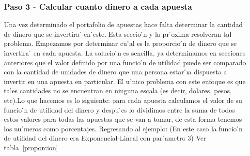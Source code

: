 \begin{table}[ht]
\centering
{}
\caption{Escogiendo apuestas que vale la pena realizar}
\label{seleccion}
\end{table}

\subsubsection{Paso 3 - Calcular cuanto dinero a cada apuesta}

Una vez determinado el portafolio de apuestas hace falta determinar la cantidad de dinero que se invertira ́ en  ́este. Esta seccio ́n y la pr ́oxima resolveran tal problema.
 Empezamos por determinar cu ́al es la proporcio ́n de dinero que se invertira ́ en cada apuesta. La solucio ́n es sencilla, ya determinamos en secciones anteriores que el valor definido por una funcio ́n de utilidad puede ser comparado con la cantidad de unidades de dinero que una persona estar ́ıa dispuesta a invertir en una apuesta en particular. El u ́nico problema con este enfoque es que tales cantidades no se encuentran en ninguna escala (es decir, dolares, pesos, etc).Lo que hacemos es lo siguiente: para cada apuesta calculamos el valor de su funcio ́n de utilidad del dinero y despu ́es lo dividimos entre la suma de todos estos valores para todas las apuestas que se van a tomar, de esta forma tenemos los nu ́meros como porcentajes.
 Regresando al ejemplo: (En este caso la funcio ́n de utilidad del dinero era Exponencial-Lineal con par ́ametro 3)
Ver tabla~\ref{proporcion}


